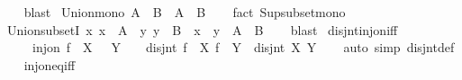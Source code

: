 \begin{isabellebody}
%
\isadelimproof
\ \ %
\endisadelimproof
%
\isatagproof
{}\isamarkupfalse%
\ blast%
\endisatagproof
{\isafoldproof}%
%
\isadelimproof
\isanewline
%
\endisadelimproof
\isanewline
{}\isamarkupfalse%
\ Union{\isacharunderscore}{\kern0pt}mono{\isacharcolon}{\kern0pt}\ {\isachardoublequoteopen}A\ {\isasymsubseteq}\ B\ {\isasymLongrightarrow}\ {\isasymUnion}A\ {\isasymsubseteq}\ {\isasymUnion}B{\isachardoublequoteclose}\isanewline
%
\isadelimproof
\ \ %
\endisadelimproof
%
\isatagproof
{}\isamarkupfalse%
\ {\isacharparenleft}{\kern0pt}fact\ Sup{\isacharunderscore}{\kern0pt}subset{\isacharunderscore}{\kern0pt}mono{\isacharparenright}{\kern0pt}%
\endisatagproof
{\isafoldproof}%
%
\isadelimproof
\isanewline
%
\endisadelimproof
\isanewline
{}\isamarkupfalse%
\ Union{\isacharunderscore}{\kern0pt}subsetI{\isacharcolon}{\kern0pt}\ {\isachardoublequoteopen}{\isacharparenleft}{\kern0pt}{\isasymAnd}x{\isachardot}{\kern0pt}\ x\ {\isasymin}\ A\ {\isasymLongrightarrow}\ {\isasymexists}y{\isachardot}{\kern0pt}\ y\ {\isasymin}\ B\ {\isasymand}\ x\ {\isasymsubseteq}\ y{\isacharparenright}{\kern0pt}\ {\isasymLongrightarrow}\ {\isasymUnion}A\ {\isasymsubseteq}\ {\isasymUnion}B{\isachardoublequoteclose}\isanewline
%
\isadelimproof
\ \ %
\endisadelimproof
%
\isatagproof
{}\isamarkupfalse%
\ blast%
\endisatagproof
{\isafoldproof}%
%
\isadelimproof
\isanewline
%
\endisadelimproof
\isanewline
{}\isamarkupfalse%
\ disjnt{\isacharunderscore}{\kern0pt}inj{\isacharunderscore}{\kern0pt}on{\isacharunderscore}{\kern0pt}iff{\isacharcolon}{\kern0pt}\isanewline
\ \ \ \ \ {\isachardoublequoteopen}{\isasymlbrakk}inj{\isacharunderscore}{\kern0pt}on\ f\ {\isacharparenleft}{\kern0pt}{\isasymUnion}{\isasymA}{\isacharparenright}{\kern0pt}{\isacharsemicolon}{\kern0pt}\ X\ {\isasymin}\ {\isasymA}{\isacharsemicolon}{\kern0pt}\ Y\ {\isasymin}\ {\isasymA}{\isasymrbrakk}\ {\isasymLongrightarrow}\ disjnt\ {\isacharparenleft}{\kern0pt}f\ {\isacharbackquote}{\kern0pt}\ X{\isacharparenright}{\kern0pt}\ {\isacharparenleft}{\kern0pt}f\ {\isacharbackquote}{\kern0pt}\ Y{\isacharparenright}{\kern0pt}\ {\isasymlongleftrightarrow}\ disjnt\ X\ Y{\isachardoublequoteclose}\isanewline
%
\isadelimproof
\ \ %
\endisadelimproof
%
\isatagproof
{}\isamarkupfalse%
\ {\isacharparenleft}{\kern0pt}auto\ simp{\isacharcolon}{\kern0pt}\ disjnt{\isacharunderscore}{\kern0pt}def{\isacharparenright}{\kern0pt}\isanewline
\ \ \isamarkupfalse%
\ inj{\isacharunderscore}{\kern0pt}on{\isacharunderscore}{\kern0pt}eq{\isacharunderscore}{\kern0pt}iff\ \isamarkupfalse%

\end{isabellebody}
